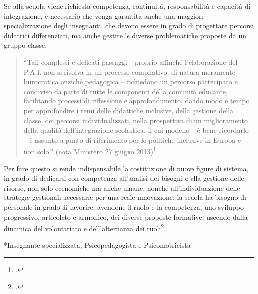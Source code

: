 Se alla scuola viene richiesta competenza, continuità, responsabilità e capacità di integrazione, è necessario che venga garantita anche una maggiore specializzazione degli insegnanti, che devono essere in grado di progettare percorsi didattici differenziati, ma anche gestire le diverse problematiche proposte da un gruppo classe.
\begin{quote}
“Tali complessi e delicati passaggi – proprio affinché l'elaborazione del P.A.I. non si risolva in un processo compilativo, di natura meramente burocratica anziché pedagogica – richiedono un percorso partecipato e condiviso da parte di tutte le componenti della comunità educante, facilitando processi di riflessione e approfondimento, dando modo e tempo per approfondire i temi delle didattiche inclusive, della gestione della classe, dei percorsi individualizzati, nella prospettiva di un miglioramento della qualità dell'integrazione scolastica, il cui modello – è bene ricordarlo – è assunto a punto di riferimento per le politiche inclusive in Europa e non solo.” (nota Ministero 27 giugno 2013)\footcite{Nota_1551_2013}
\end{quote}

Per fare questo si rende indispensabile la costituzione di nuove figure di sistema, in grado di dedicarsi con competenza all'analisi dei bisogni e alla gestione delle risorse, non solo economiche ma anche umane, nonché all'individuazione delle strategie gestionali necessarie per una reale innovazione; la scuola ha bisogno di personale in grado di favorire, avendone il ruolo e la competenza, uno sviluppo progressivo, articolato e armonico, dei diverse proposte formative, uscendo dalla dinamica del volontariato e dell'alternanza dei ruoli\footcite{Morale2013}.

*Insegnante specializzata, Psicopedagogista e Psicomotricista
